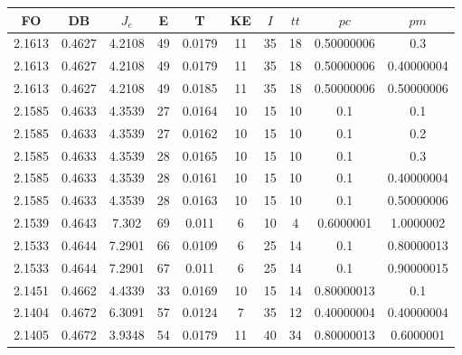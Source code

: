 \begin{table}[h!]
    \footnotesize
    \begin{center}
        \begin{tabular}{|c|c|c|c|c|c|c|c|c|c|}
        \hline
            {\bf FO} & {\bf DB} & $J_e$ & {\bf E} & {\bf T} & {\bf KE} & $I$ & $tt$ & $pc$ & $pm$ \\
        \hline
        \hline
            2.1613 & 0.4627  & 4.2108 & 49 & 0.0179 & 11 & 35 & 18 & 0.50000006 & 0.3\\
        \hline
        \hline
            2.1613 & 0.4627  & 4.2108 & 49 & 0.0179 & 11 & 35 & 18 & 0.50000006 & 0.40000004\\
        \hline
        \hline
            2.1613 & 0.4627  & 4.2108 & 49 & 0.0185 & 11 & 35 & 18 & 0.50000006 & 0.50000006\\
        \hline
        \hline
            2.1585 & 0.4633  & 4.3539 & 27 & 0.0164 & 10 & 15 & 10 & 0.1 & 0.1\\
        \hline
        \hline
            2.1585 & 0.4633  & 4.3539 & 27 & 0.0162 & 10 & 15 & 10 & 0.1 & 0.2\\
        \hline
        \hline
            2.1585 & 0.4633  & 4.3539 & 28 & 0.0165 & 10 & 15 & 10 & 0.1 & 0.3\\
        \hline
        \hline
            2.1585 & 0.4633  & 4.3539 & 28 & 0.0161 & 10 & 15 & 10 & 0.1 & 0.40000004\\
        \hline
        \hline
            2.1585 & 0.4633  & 4.3539 & 28 & 0.0163 & 10 & 15 & 10 & 0.1 & 0.50000006\\
        \hline
        \hline
            2.1539 & 0.4643  & 7.302 & 69 & 0.011 & 6 & 10 & 4 & 0.6000001 & 1.0000002\\
        \hline
        \hline
            2.1533 & 0.4644  & 7.2901 & 66 & 0.0109 & 6 & 25 & 14 & 0.1 & 0.80000013\\
        \hline
        \hline
            2.1533 & 0.4644  & 7.2901 & 67 & 0.011 & 6 & 25 & 14 & 0.1 & 0.90000015\\
        \hline
        \hline
            2.1451 & 0.4662  & 4.4339 & 33 & 0.0169 & 10 & 15 & 14 & 0.80000013 & 0.1\\
        \hline
        \hline
            2.1404 & 0.4672  & 6.3091 & 57 & 0.0124 & 7 & 35 & 12 & 0.40000004 & 0.40000004\\
        \hline
        \hline
            2.1405 & 0.4672  & 3.9348 & 54 & 0.0179 & 11 & 40 & 34 & 0.80000013 & 0.6000001\\
        \hline

\end{tabular}
\end{center}
\end{table}
